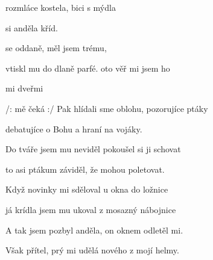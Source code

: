 

\zs
{} rozmláce kostela, bici s  mýdla

  si anděla   kříd.

 se  oddaně,  měl jsem  trému,

 vtiskl  mu do dlaně   parfé.
\ks
\zr
{}oto  věř mi  jsem ho 

 mi  dveřmi  

/:  mě čeká   :/
\kr
\zs
Pak hlídali sme oblohu, pozorujíce ptáky

debatujíce o Bohu a hraní na vojáky.

Do tváře jsem mu neviděl pokoušel si ji schovat

to asi ptákum záviděl, že mohou poletovat.
\ks

\zr
\kr

\zs
Když novinky mi sděloval u okna do ložnice

já krídla jsem mu ukoval z mosazný nábojnice

A tak jsem pozbyl anděla, on oknem odletěl mi.

Však přítel, prý mi udělá nového z mojí helmy.
\ks

\zr
\kr
\kp






